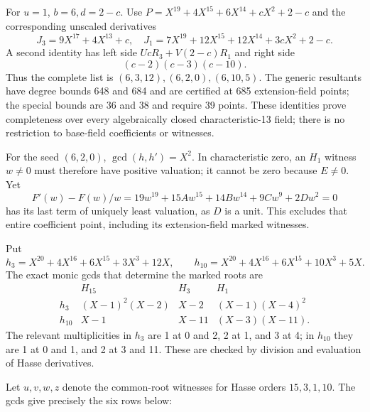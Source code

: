 \documentclass[
  british,
  10pt,
  a4paper,
]{article}
\begin{document}
For \(u=1\), \(b=6,d=2-c\). Use \(P=X^{19}+4X^{15}+6X^{14}+cX^2+2-c\)
and the corresponding unscaled derivatives \[
J_3=9X^{17}+4X^{13}+c,\quad
J_1=7X^{19}+12X^{15}+12X^{14}+3cX^2+2-c.
\] A second identity has left side \(UcR_3+V(2-c)R_1\) and right side \[
(c-2)(c-3)(c-10).
\tag{S17}
\] Thus the complete list is \((6,3,12),(6,2,0),(6,10,5)\). The generic
resultants have degree bounds 648 and 684 and are certified at 685
extension-field points; the special bounds are 36 and 38 and require 39
points. These identities prove completeness over every algebraically
closed characteristic-13 field; there is no restriction to base-field
coefficients or witnesses.

For the seed \((6,2,0)\), \(\gcd(h,h')=X^2\). In characteristic zero, an
\(H_1\) witness \(w\ne0\) must therefore have positive valuation; it
cannot be zero because \(E\ne0\). Yet \[
F'(w)-F(w)/w
=19w^{19}+15Aw^{15}+14Bw^{14}+9Cw^9+2Dw^2=0
\] has its last term of uniquely least valuation, as \(D\) is a unit.
This excludes that entire coefficient point, including its
extension-field marked witnesses.

Put \[
h_3=X^{20}+4X^{16}+6X^{15}+3X^3+12X,\qquad
h_{10}=X^{20}+4X^{16}+6X^{15}+10X^3+5X.
\] The exact monic gcds that determine the marked roots are \[
\begin{array}{c|ccc}
 &H_{15}&H_3&H_1\\ \hline
h_3&(X-1)^2(X-2)&X-2&(X-1)(X-4)^2\\
h_{10}&X-1&X-11&(X-3)(X-11).
\end{array}
\] The relevant multiplicities in \(h_3\) are 1 at 0 and 2, 2 at 1, and
3 at 4; in \(h_{10}\) they are 1 at 0 and 1, and 2 at 3 and 11. These
are checked by division and evaluation of Hasse derivatives.

Let \(u,v,w,z\) denote the common-root witnesses for Hasse orders
\(15,3,1,10\). The gcds give precisely the six rows below:
\end{document}
